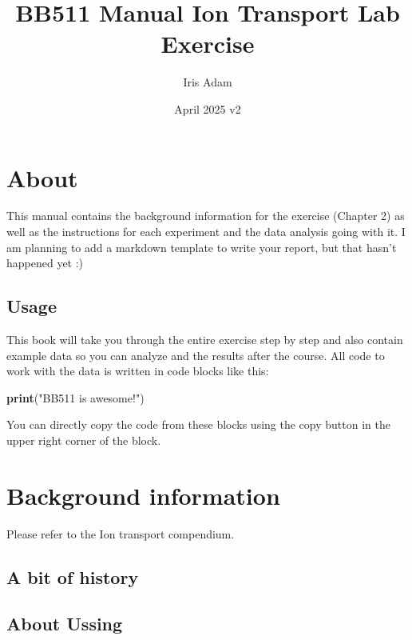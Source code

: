 \documentclass[
]{book}
\title{BB511 Manual Ion Transport Lab Exercise}
\author{Iris Adam}
\date{April 2025 v2}
\newenvironment{Shaded}{\begin{snugshade}}{\end{snugshade}}
\newcommand{\FunctionTok}[1]{\textcolor[rgb]{0.13,0.29,0.53}{\textbf{#1}}}
\newcommand{\NormalTok}[1]{#1}
\newcommand{\StringTok}[1]{\textcolor[rgb]{0.31,0.60,0.02}{#1}}
\begin{document}
\maketitle

{
\setcounter{tocdepth}{1}
\tableofcontents
}
\chapter{About}\label{about}

This manual contains the background information for the exercise (Chapter 2) as well as the instructions for each experiment and the data analysis going with it. I am planning to add a markdown template to write your report, but that hasn't happened yet :)

\section{Usage}\label{usage}

This book will take you through the entire exercise step by step and also contain example data so you can analyze and the results after the course.
All code to work with the data is written in code blocks like this:

\begin{Shaded}
\begin{Highlighting}[]
\FunctionTok{print}\NormalTok{(}\StringTok{"BB511 is awesome!"}\NormalTok{)}
\end{Highlighting}
\end{Shaded}

You can directly copy the code from these blocks using the copy button in the upper right corner of the block.

\chapter{Background information}\label{background-information}

Please refer to the Ion transport compendium.

\section{A bit of history}\label{a-bit-of-history}

\section{About Ussing}\label{about-ussing}
\end{document}
